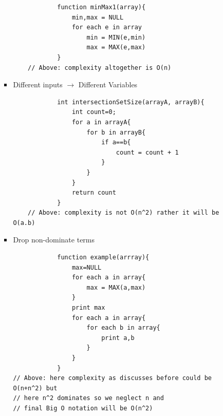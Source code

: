\documentclass[11pt]{article}
\begin{document}
\begin{enumerate}
\begin{itemize}
\begin{itemize}
\begin{verbatim}
            function minMax1(array){
                min,max = NULL
                for each e in array
                    min = MIN(e,min)
                    max = MAX(e,max)
            }
    // Above: complexity altogether is O(n)
                \end{verbatim}
                \item Different inputs $\rightarrow$ Different Variables
                \begin{verbatim}
            int intersectionSetSize(arrayA, arrayB){
                int count=0;
                for a in arrayA{
                    for b in arrayB{
                        if a==b{
                            count = count + 1
                        }
                    }
                }
                return count
            }
    // Above: complexity is not O(n^2) rather it will be O(a.b)
                \end{verbatim}
                \item Drop non-dominate terms
                \begin{verbatim}
            function example(arrray){
                max=NULL
                for each a in array{
                    max = MAX(a,max)
                }
                print max
                for each a in array{
                    for each b in array{
                        print a,b
                    }
                }
            }
// Above: here complexity as discusses before could be O(n+n^2) but 
// here n^2 dominates so we neglect n and 
// final Big O notation will be O(n^2)
                \end{verbatim}
            \end{itemize}
        \end{itemize}
    \end{enumerate}
\end{document}
